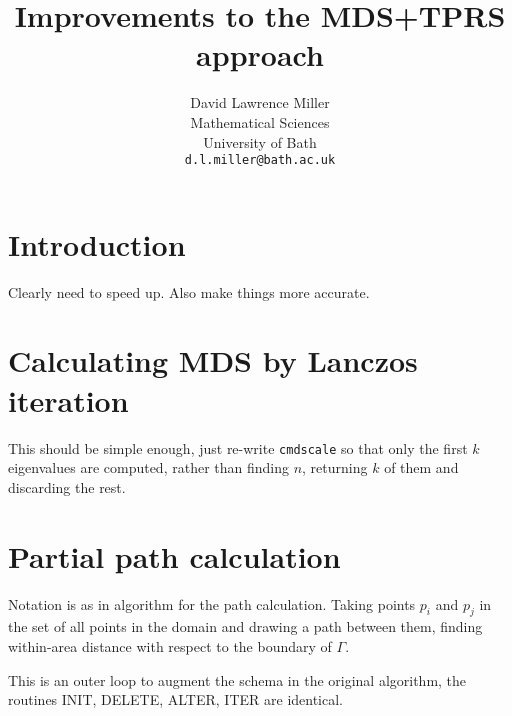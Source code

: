 \documentclass[a4paper,10pt]{article}
\title{Improvements to the MDS+TPRS approach}
\author{David Lawrence Miller\\Mathematical Sciences\\University of Bath\\\texttt{d.l.miller@bath.ac.uk}}
\begin{document}
 
 
 
\newtheorem{thm}{Theorem}[section]
 
\newtheorem{defn}{Definition}[section]
 
\maketitle

\section{Introduction}

Clearly need to speed up. Also make things more accurate.

\section{Calculating MDS by Lanczos iteration}

This should be simple enough, just re-write \texttt{cmdscale} so that only the first $k$ eigenvalues are computed, rather than finding $n$, returning $k$ of them and discarding the rest.

\section{Partial path calculation}

Notation is as in algorithm for the path calculation. Taking points $p_i$ and $p_j$ in the set of all points in the domain and drawing a path between them, finding within-area distance with respect to the boundary of $\Gamma$.

This is an outer loop to augment the schema in the original algorithm, the routines INIT, DELETE, ALTER, ITER are identical.
\end{document}
